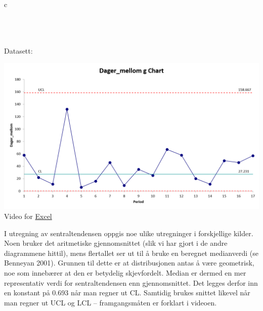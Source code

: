 \documentclass[
]{book}
\begin{document}
\begin{longtable}[c]{c}
 \\





 \\





 \\





 \\




\end{longtable}

Datasett:

\includegraphics{gdiagram.png}
Video for \href{https://vimeo.com/624349171}{Excel}

I utregning av sentraltendensen oppgis noe ulike utregninger i forskjellige kilder. Noen bruker det aritmetiske gjennomsnittet (slik vi har gjort i de andre diagrammene hittil), mens flertallet ser ut til å bruke en beregnet medianverdi (se Benneyan 2001). Grunnen til dette er at distribusjonen antas å være geometrisk, noe som innebærer at den er betydelig skjevfordelt. Median er dermed en mer representativ verdi for sentraltendensen enn gjennomsnittet. Det legges derfor inn en konstant på 0.693 når man regner ut CL. Samtidig brukes snittet likevel når man regner ut UCL og LCL -- framgangsmåten er forklart i videoen.
\end{document}
